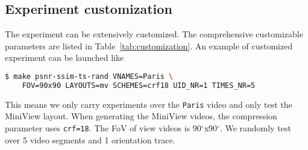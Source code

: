 


\subsection{Experiment customization}
\label{sec:customization}
The experiment can be extensively customized. The comprehensive customizable parameters are listed in
Table~\ref{tab:customization}. An example of customized experiment can be launched like
\begin{lstlisting}[language=bash, numbers=none]
  $ make psnr-ssim-ts-rand VNAMES=Paris \
    FOV=90x90 LAYOUTS=mv SCHEMES=crf18 UID_NR=1 TIMES_NR=5
\end{lstlisting}
This means we only carry experiments over the {\tt Paris} video and only test the MiniView layout. When generating the
MiniView videos, the compression parameter uses {\tt crf=18}. The FoV of view videos is 90$^{\circ}$x90$^{\circ}$. We
randomly test over 5 video segments and 1 orientation trace.




